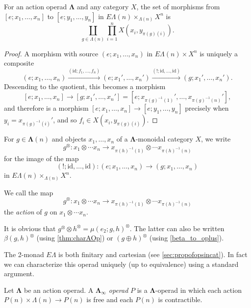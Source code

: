 \documentclass{amsbook} %
\newcommand{\mb}{\mathbf}
\newcommand{\id}{\textrm{id}}
\newcommand{\ML}{\mathbf{\Lambda}}
\numberwithin{section}{chapter}
\begin{document}
\begin{lem}\label{hom-set-lemma}
For an action operad $\mb{\Lambda}$ and any category $X$, the set of morphisms from $[e; x_1, \ldots, x_n]$ to $[e; y_1, \ldots, y_n]$ in $E\Lambda(n) \times_{\Lambda(n)} X^{n}$ is
\[
\coprod_{g \in \Lambda(n)} \prod_{i=1}^{n} X(x_i, y_{\pi(g)(i)}).
\]
\end{lem}
\begin{proof}
A morphism with source $(e; x_1, \ldots, x_n)$ in $E\Lambda(n) \times X^{n}$ is uniquely a composite
\[
(e; x_1, \ldots, x_n) \stackrel{(\id; f_{1}, \ldots, f_{n})}{\longrightarrow} (e; x_1', \ldots, x_n') \stackrel{(!; \id, \ldots, \id)}{\longrightarrow} (g; x_1', \ldots, x_n').
\]
Descending to the quotient, this becomes a morphism
\[
[e; x_1, \ldots, x_n] \to [g; x_1', \ldots, x_n'] = [e; x_{\pi(g)^{-1}(1)}', \ldots, x_{\pi(g)^{-1}(n)}'],
\]
and therefore is a morphism $[e; x_1, \ldots, x_n] \to [e; y_1, \ldots, y_n]$ precisely when $y_i = x_{\pi(g)^{-1}(i)}'$, and so $f_i \in   X(x_i, y_{\pi(g)(i)})$.
\end{proof}

\begin{nota}\label{tensor_notation}
For $g \in \ML(n)$ and objects $x_1, \ldots, x_n$ of a $\ML$-monoidal category $X$, we write 
\[
g^{\otimes}:x_1 \otimes \cdots x_n \to x_{\pi(h)^{-1}(1)} \otimes \cdots x_{\pi(h)^{-1}(n)}
\]
for the image of the map
\[
(!; \mathrm{id}, \ldots, \mathrm{id}): (e; x_1, \ldots, x_n) \to (g; x_1, \ldots, x_n)
\]
in $E\Lambda(n) \times_{\Lambda(n)} X^{n}$.
\end{nota}

\begin{Defi}\label{action_map}
We call the map 
\[
g^{\otimes}:x_1 \otimes \cdots x_n \to x_{\pi(h)^{-1}(1)} \otimes \cdots x_{\pi(h)^{-1}(n)}
\]
the \emph{action} of $g$ on $x_1 \otimes \cdots x_n$.
\end{Defi}

\begin{rem}
It is obvious that $g^{\otimes} \otimes h^{\otimes} = \mu(e_2; g, h)^{\otimes}$. The latter can also be written $\beta(g, h)^{\otimes}$ (using \cref{thm:charAOp}) or $(g \oplus h)^{\otimes}$  (using \cref{beta_to_oplus}).
\end{rem}

The 2-monad $E\Lambda$ is both finitary and cartesian (see \cref{sec:propofopsincat}).  In fact we can characterize this operad uniquely (up to equivalence) using a standard argument.

\begin{Defi}
Let $\mb{\Lambda}$ be an action operad.  A \textit{$\mb{\Lambda}_{\infty}$ operad} $P$ is a $\mb{\Lambda}$-operad in which each action $P(n) \times \Lambda(n) \rightarrow P(n)$ is free and each $P(n)$ is contractible.
\end{Defi}
\end{document}
